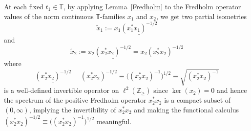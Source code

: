 \documentclass[11pt]{article}
\numberwithin{equation}{section}
\begin{document}
At each fixed $t_{1}\in\mathbb{T}$, by applying Lemma~\ref{Fredholm} to the Fredholm
operator values of the norm continuous $\mathbb{T}$-families $x_{1}$ and
$x_{2}$, we get two partial isometries
\[
\tilde{x}_{1}:=x_{1}\underline{( x_{1}^{\ast}x_{1}) ^{-1/2}}
\]
and
\[
\tilde{x}_{2}:=x_{2}\underline{( x_{2}^{\ast}x_{2}) ^{-1/2}%
}=x_{2}( x_{2}^{\ast}x_{2}) ^{-1/2}%
\]
where
\[
\underline{( x_{2}^{\ast}x_{2}) ^{-1/2}}=( x_{2}^{\ast
}x_{2}) ^{-1/2}\equiv\big( ( x_{2}^{\ast}x_{2})
^{-1}\big) ^{1/2}\equiv\sqrt{( x_{2}^{\ast}x_{2}) ^{-1}}%
\]
is a well-defined invertible operator on $\ell^{2}( \mathbb{Z}_{\geq
}) $ since $\ker( x_{2}) =0$ and hence the spectrum of the
positive Fredholm operator $x_{2}^{\ast}x_{2}$ is a compact subset of $(
0,\infty) $, implying the invertibility of $x_{2}^{\ast}x_{2}$ and
making the functional calculus $( x_{2}^{\ast}x_{2})
^{-1/2}\equiv\big( ( x_{2}^{\ast}x_{2}) ^{-1}\big) ^{1/2}$ meaningful.
\end{document}
